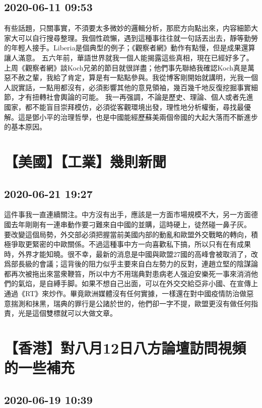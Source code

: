 \documentclass[twocolumn]{ctexart}
\begin{document}
\subsection*{2020-06-11 09:53}

有些話題，只關事實，不須要太多微妙的邏輯分析，那麽方向點出來，内容細節大家大可以自行搜尋整理。我個性疏懶，遇到這種事往往就一句話丟出去，靜等勤勞的年輕人接手。Liberia是個典型的例子；《觀察者網》動作有點慢，但是成果還算讓人滿意。
五六年前，華語世界就我一個人能揭露這些真相，現在已經好多了。上周《觀察者網》談Koch兄弟的節目就很詳盡；他們事先聯絡我確認Koch真是萬惡不赦之輩，我給了肯定，算是有一點點參與。我從博客剛開始就講明，光我一個人説實話，一點用都沒有，必須影響其他的意見領袖，幾百幾千地反復挖掘事實細節，才有扭轉社會輿論的可能。
我一再强調，不論是歷史、理論、個人或者先進國家，都不能盲目崇拜模仿，必須從客觀環境出發，理性地分析權衡，尋找最優解。這是鄧小平的治理哲學，也是中國能經歷蘇美兩個帝國的大起大落而不斷進步的基本原因。
\section*{【美國】【工業】幾則新聞}
\subsection*{2020-06-21 19:27}

這件事我一直連續關注。中方沒有出手，應該是一方面市場規模不大，另一方面德國去年剛剛有一連串動作要刁難來自中國的並購，這時硬上，徒然碰一鼻子灰。
要改變這個局勢，外交部必須把握當前美國内部的動亂和歐盟外交戰略的轉向，積極爭取更緊密的中歐關係。不過這種事中方一向喜歡私下搞，所以只有在有成果時，外界才能知曉。很不幸，最新的消息是中國與歐盟27國的高峰會被取消了，改爲部長級的會議；這背後的阻力似乎主要來自白左勢力的反對，連趙立堅的陰謀論都再次被拖出來當衆鞭笞，所以中方不用瑞典對患病老人强迫安樂死一事來消消他們的氣焰，是自縛手脚。如果不想自己出面，可以在外交交給亞非小國、在宣傳上通過《RT》來炒作。畢竟歐洲媒體沒有任何實據，一樣還在對中國疫情防治做惡意揣測和抹黑，瑞典的罪行是公諸於世的，他們卻一字不提，歐盟更沒有做任何指責，光是這個雙標就可以大做文章。
\section*{【香港】對八月12日八方論壇訪問視頻的一些補充}
\subsection*{2020-06-19 10:39}
\end{document}
